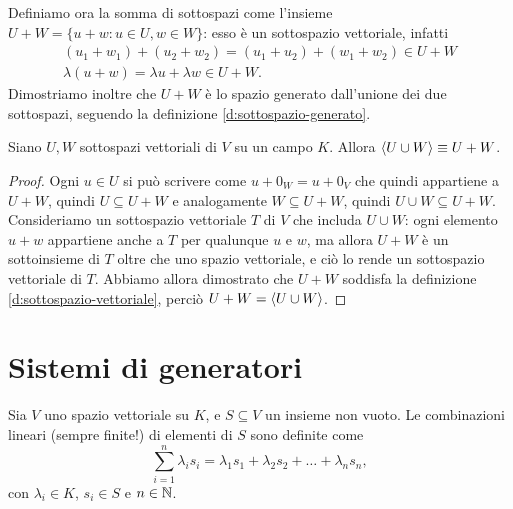 Definiamo ora la somma di sottospazi come l'insieme $U+W=\{u+w\colon u\in U,w\in W\}$: esso è un sottospazio vettoriale, infatti
\begin{equation*}
	\begin{gathered}
		(u_1+w_1)+(u_2+w_2)=(u_1+u_2)+(w_1+w_2)\in U+W\\
		\lambda(u+w)=\lambda u+\lambda w\in U+W.
	\end{gathered}
\end{equation*}
Dimostriamo inoltre che $U+W$ è lo spazio generato dall'unione dei due sottospazi, seguendo la definizione \ref{d:sottospazio-generato}.
\begin{teorema}
	Siano $U,W$ sottospazi vettoriali di $V$ su un campo $K$. Allora $\left\langle{U\cup W}\right\rangle\equiv U+W$.
\end{teorema}
\begin{proof}
	Ogni $u\in U$ si può scrivere come $u+0_W=u+0_V$ che quindi appartiene a $U+W$, quindi $U\subseteq U+W$ e analogamente $W\subseteq U+W$, quindi $U\cup W\subseteq U+W$.
	Consideriamo un sottospazio vettoriale $T$ di $V$ che includa $U\cup W$: ogni elemento $u+w$ appartiene anche a $T$ per qualunque $u$ e $w$, ma allora $U+W$ è un sottoinsieme di $T$ oltre che uno spazio vettoriale, e ciò lo rende un sottospazio vettoriale di $T$.
	Abbiamo allora dimostrato che $U+W$ soddisfa la definizione \ref{d:sottospazio-vettoriale}, perciò $U+W=\left\langle{U\cup W}\right\rangle$.
\end{proof}

\section{Sistemi di generatori} \label{sec:sistemi-generatori}
Sia $V$ uno spazio vettoriale su $K$, e $S\subseteq V$ un insieme non vuoto.
Le combinazioni lineari (sempre finite!) di elementi di $S$ sono definite come
\begin{equation*}
	\sum_{i=1}^n\lambda_i  s_i=\lambda_1  s_1+\lambda_2  s_2+\dots+\lambda_n  s_n,
\end{equation*}
con $\lambda_i\in K$, $  s_i\in S$ e $n\in\mathbb{N}$.


